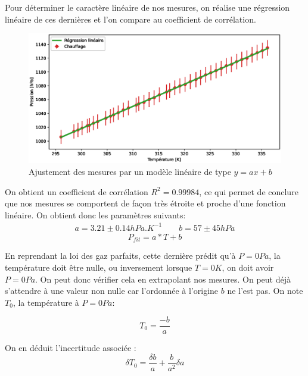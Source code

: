 \documentclass[12pt]{article}
\begin{document}
\newpage
Pour déterminer le caractère linéaire de nos mesures, on réalise une régression linéaire de ces dernières et l'on compare au coefficient de corrélation. 
\begin{figure}[!h]
	\begin{center}
		\includegraphics[scale=0.65]{img/exp2_graph2.eps}
		\caption{Ajustement des mesures par un modèle linéaire de type $y=ax+b$}
	\end{center}
	\label{Exp2_graph2}
\end{figure}

On obtient un coefficient de corrélation $R^2 = 0.99984$, ce qui permet de conclure que nos mesures se comportent de façon très étroite et proche d'une fonction linéaire. On obtient donc les paramètres suivants:
\begin{align*}
	a = 3.21 \pm 0.14 hPa.K^{-1} \quad \quad b = 57 \pm 45 hPa
\end{align*}
\begin{equation*}
	P_{fit} = a * T + b
\end{equation*}

En reprendant la loi des gaz parfaits, cette dernière prédit qu'à $P = 0Pa$, la température doit être nulle, ou inversement lorsque $T = 0K$, on doit avoir $P=0Pa$. On peut donc vérifier cela
en extrapolant nos mesures. On peut déjà s'attendre à une valeur non nulle car l'ordonnée à l'origine $b$ ne l'est pas. On note $T_0$, la température à $P=0Pa$:

\begin{equation}
	T_0 = \frac{-b}{a}
\end{equation}

On en déduit l'incertitude associée :
\begin{equation}
	\delta T_0 = \frac{\delta b}{a} + \frac{b}{a^2} \delta a
\end{equation}
\end{document}
